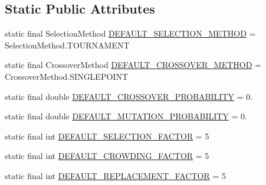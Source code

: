 \subsection*{Static Public Attributes}
\begin{DoxyCompactItemize}
\item 
static final Selection\-Method \hyperlink{classjenes_1_1stage_1_1operator_1_1common_1_1_multi_niche_crowder_3_01_t_01extends_01_chromosome_01_4_addd3f5fe352248ed9d5639e0d138f59d}{D\-E\-F\-A\-U\-L\-T\-\_\-\-S\-E\-L\-E\-C\-T\-I\-O\-N\-\_\-\-M\-E\-T\-H\-O\-D} = Selection\-Method.\-T\-O\-U\-R\-N\-A\-M\-E\-N\-T
\item 
static final Crossover\-Method \hyperlink{classjenes_1_1stage_1_1operator_1_1common_1_1_multi_niche_crowder_3_01_t_01extends_01_chromosome_01_4_aed986ca7d89144f78e73a11a5fb2f032}{D\-E\-F\-A\-U\-L\-T\-\_\-\-C\-R\-O\-S\-S\-O\-V\-E\-R\-\_\-\-M\-E\-T\-H\-O\-D} = Crossover\-Method.\-S\-I\-N\-G\-L\-E\-P\-O\-I\-N\-T
\item 
static final double \hyperlink{classjenes_1_1stage_1_1operator_1_1common_1_1_multi_niche_crowder_3_01_t_01extends_01_chromosome_01_4_a6e6d3f4e8201a341f77ac92954dbdad4}{D\-E\-F\-A\-U\-L\-T\-\_\-\-C\-R\-O\-S\-S\-O\-V\-E\-R\-\_\-\-P\-R\-O\-B\-A\-B\-I\-L\-I\-T\-Y} = 0.
\item 
static final double \hyperlink{classjenes_1_1stage_1_1operator_1_1common_1_1_multi_niche_crowder_3_01_t_01extends_01_chromosome_01_4_aa3cfe11747630124e10809b0027d6f3a}{D\-E\-F\-A\-U\-L\-T\-\_\-\-M\-U\-T\-A\-T\-I\-O\-N\-\_\-\-P\-R\-O\-B\-A\-B\-I\-L\-I\-T\-Y} = 0.
\item 
static final int \hyperlink{classjenes_1_1stage_1_1operator_1_1common_1_1_multi_niche_crowder_3_01_t_01extends_01_chromosome_01_4_a937e501fc953576f30be99a0eec9ccf4}{D\-E\-F\-A\-U\-L\-T\-\_\-\-S\-E\-L\-E\-C\-T\-I\-O\-N\-\_\-\-F\-A\-C\-T\-O\-R} = 5
\item 
static final int \hyperlink{classjenes_1_1stage_1_1operator_1_1common_1_1_multi_niche_crowder_3_01_t_01extends_01_chromosome_01_4_ae7c682fcbb8e1de5270d79ca482bd93d}{D\-E\-F\-A\-U\-L\-T\-\_\-\-C\-R\-O\-W\-D\-I\-N\-G\-\_\-\-F\-A\-C\-T\-O\-R} = 5
\item 
static final int \hyperlink{classjenes_1_1stage_1_1operator_1_1common_1_1_multi_niche_crowder_3_01_t_01extends_01_chromosome_01_4_ac38d4afc42b5f54473834e76815c7510}{D\-E\-F\-A\-U\-L\-T\-\_\-\-R\-E\-P\-L\-A\-C\-E\-M\-E\-N\-T\-\_\-\-F\-A\-C\-T\-O\-R} = 5
\end{DoxyCompactItemize}
